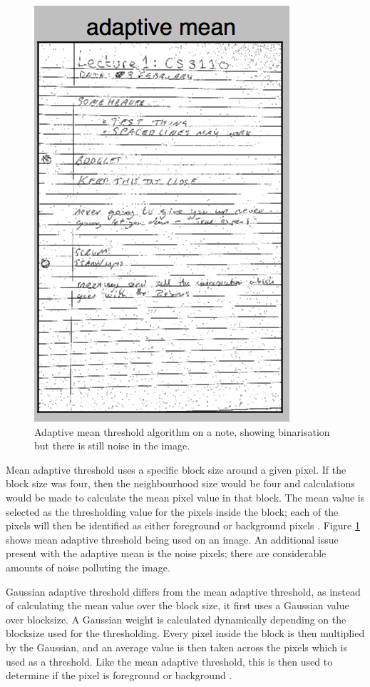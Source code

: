 \begin{figure}[H]
  \centering
  \includegraphics{images/adaptive_mean}
  \caption{Adaptive mean threshold algorithm on a note, showing binarisation but there is still noise in the image.}
  \label{fig:adaptive_mean}
\end{figure}

Mean adaptive threshold uses a specific block size around a given pixel. If the block size was four, then the neighbourhood size would be four and calculations would be made to calculate the mean pixel value in that block. The mean value is selected as the thresholding value for the pixels inside the block; each of the pixels will then be identified as either foreground or background pixels \cite{citeulike:14021401}. Figure \ref{fig:adaptive_mean} shows mean adaptive threshold being used on an image. An additional issue present with the adaptive mean is the noise pixels; there are considerable amounts of noise polluting the image.

Gaussian adaptive threshold differs from the mean adaptive threshold, as instead of calculating the mean value over the block size, it first uses a Gaussian value over blocksize. A Gaussian weight is calculated dynamically depending on the blocksize used for the thresholding. Every pixel inside the block is then multiplied by the Gaussian, and an average value is then taken across the pixels which is used as a threshold. Like the mean adaptive threshold, this is then used to determine if the pixel is foreground or background \cite{bradski2008learning}\cite{citeulike:14021401}.


